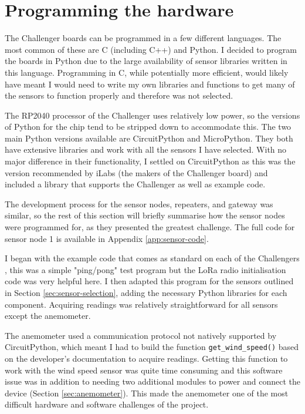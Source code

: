 \section{Programming the hardware}

The Challenger boards can be programmed in a few different languages. The most
common of these are C (including C++) and Python. I decided to program the
boards in Python due to the large availability of sensor libraries written in
this language. Programming in C, while potentially more efficient, would likely
have meant I would need to write my own libraries and functions to get many of
the sensors to function properly and therefore was not selected.

The RP2040 processor of the Challenger uses relatively low power, so the
versions of Python for the chip tend to be stripped down to accommodate this.
The two main Python versions available are CircuitPython and MicroPython. They
both have extensive libraries and work with all the sensors I have selected.
With no major difference in their functionality, I settled on CircuitPython as
this was the version recommended by iLabs (the makers of the Challenger board)
and included a library that supports the Challenger as well as example code.

The development process for the sensor nodes, repeaters, and gateway was
similar, so the rest of this section will briefly summarise how the sensor nodes
were programmed for, as they presented the greatest challenge. The full code for
sensor node 1 is available in Appendix \ref{app:sensor-code}.

I began with the example code that comes as standard on each of the Challengers
\cite{needell_challenger-rp2040_2025}, this was a simple "ping/pong" test
program but the LoRa radio initialisation code was very helpful here. I then
adapted this program for the sensors outlined in Section
\ref{sec:sensor-selection}, adding the necessary Python libraries for each
component. Acquiring readings was relatively straightforward for all sensors
except the anemometer.

The anemometer used a communication protocol not natively supported by
CircuitPython, which meant I had to build the function
\texttt{get\_wind\_speed()} based on the developer's documentation
\cite{dfrobotGuide} to acquire readings. Getting this function to work with the
wind speed sensor was quite time consuming and this software issue was in
addition to needing two additional modules to power and connect the device
(Section \ref{sec:anemometer}). This made the anemometer one of the most
difficult hardware and software challenges of the project.

